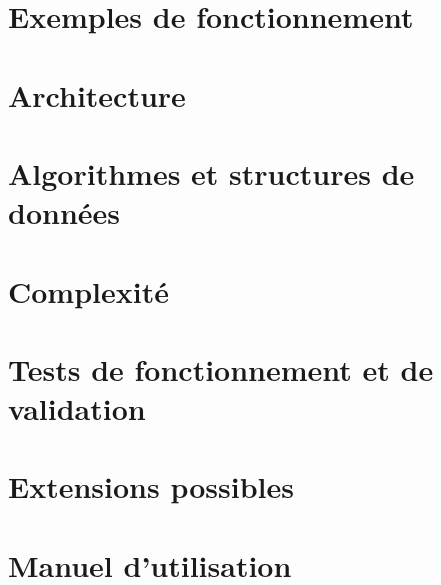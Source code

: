 \documentclass{article}
\begin{document}
\newpage

\section{Exemples de fonctionnement}



\section{Architecture}



\section{Algorithmes et structures de données}



\section{Complexité}



\section{Tests de fonctionnement et de validation}



\section{Extensions possibles}



\section{Manuel d'utilisation}




\nocite{*}

 
 
\end{document}
